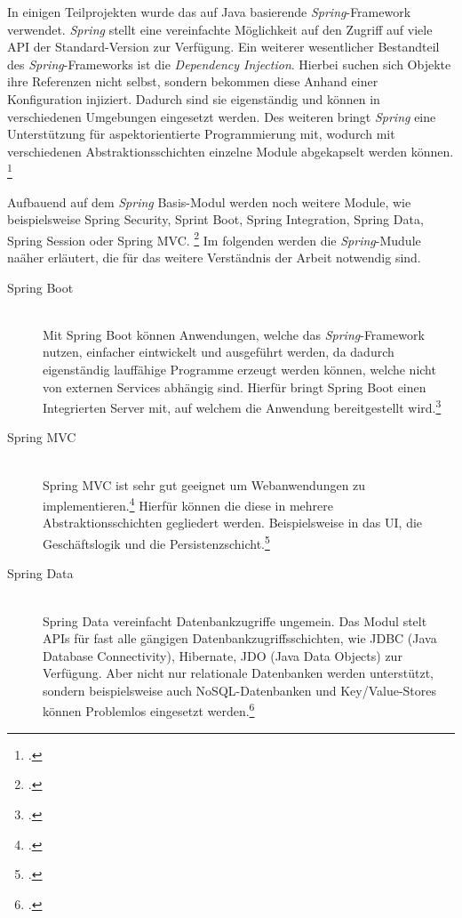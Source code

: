 In einigen Teilprojekten wurde das auf Java basierende \textit{Spring}-Framework verwendet. \textit{Spring} stellt eine vereinfachte Möglichkeit auf den Zugriff auf viele \ac{API} der Standard-Version zur Verfügung. Ein weiterer wesentlicher Bestandteil des \textit{Spring}-Frameworks ist die \textit{Dependency Injection}. Hierbei suchen sich Objekte ihre Referenzen nicht selbst, sondern bekommen diese Anhand einer Konfiguration injiziert. Dadurch sind sie eigenständig und können in verschiedenen Umgebungen eingesetzt werden. Des weiteren bringt \textit{Spring} eine Unterstützung für aspektorientierte Programmierung mit, wodurch mit verschiedenen Abstraktionsschichten einzelne Module abgekapselt werden können. \footcite[Vgl.][2]{spring3}

Aufbauend auf dem \textit{Spring} Basis-Modul werden noch weitere Module, wie beispielsweise Spring Security, Sprint Boot, Spring Integration, Spring Data, Spring Session oder Spring MVC. \footcite[Vgl.][2]{springPivotal} Im folgenden werden die \textit{Spring}-Mudule naäher erläutert, die für das weitere Verständnis der Arbeit notwendig sind.

\begin{description}
  \item[Spring Boot] \hfill \\
    Mit Spring Boot können Anwendungen, welche das \textit{Spring}-Framework nutzen, einfacher eintwickelt und ausgeführt werden, da dadurch eigenständig lauffähige Programme erzeugt werden können, welche nicht von externen Services abhängig sind. Hierfür bringt Spring Boot einen Integrierten Server mit, auf welchem die Anwendung bereitgestellt wird.\footcite[Vgl.][1]{springBoot}
  \item[Spring MVC] \hfill \\
    Spring MVC ist sehr gut geeignet um Webanwendungen zu implementieren.\footcite[Vgl.][3]{spring3} Hierfür können die diese in mehrere Abstraktionsschichten gegliedert werden. Beispielsweise in das \ac{UI}, die Geschäftslogik und die Persistenzschicht.\footcite[Vgl.][21]{springMvc}
  \item[Spring Data] \hfill \\
    Spring Data vereinfacht Datenbankzugriffe ungemein. Das Modul stelt \acp{API} für fast alle gängigen Datenbankzugriffsschichten, wie JDBC (Java Database Connectivity), Hibernate, JDO (Java Data Objects) zur Verfügung. Aber nicht nur relationale Datenbanken werden unterstützt, sondern beispielsweise auch NoSQL-Datenbanken und Key/Value-Stores können Problemlos eingesetzt werden.\footcite[Vgl.][3f]{springData}
\end{description}


